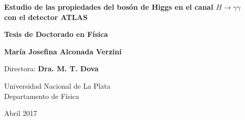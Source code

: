 

\thispagestyle{empty}
\begin{center}

\vspace{1cm}
{\bf \Huge  Estudio de las propiedades del bos\'on de Higgs en el canal $H\to\gamma\gamma$\\
	con el detector ATLAS\\}
\vspace{1cm}
\vspace*{2cm}

{\bf Tesis de Doctorado en F\'isica \\}


\vspace*{7cm}
{\Large \bf Mar\'ia Josefina Alconada Verzini \\}
\vspace{2cm}

{Directora: \bf Dra. M. T. Dova \\}
\vspace{0.5cm}

{Universidad Nacional de La Plata\\}
{Departamento de F\'isica\\}

{Abril 2017}
\end{center}










